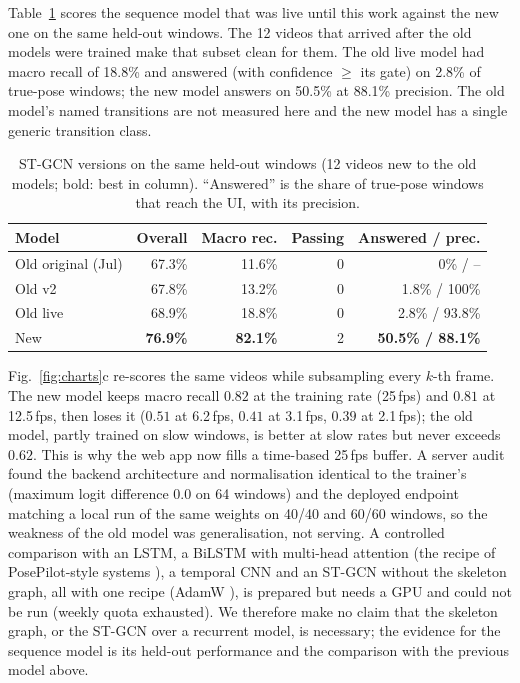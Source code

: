  Table~\ref{tab:stgcn} scores the sequence model that was live until this work against the new one on the same held-out windows. The 12 videos that arrived after the old models were trained make that subset clean for them. The old live model had macro recall of 18.8\% and answered (with confidence $\ge$ its gate) on 2.8\% of true-pose windows; the new model answers on 50.5\% at 88.1\% precision. The old model's named transitions are not measured here and the new model has a single generic transition class.
\begin{table}[t]
\centering\footnotesize
\caption{ST-GCN versions on the same held-out windows (12 videos new to the old models; bold: best in column). ``Answered'' is the share of true-pose windows that reach the UI, with its precision.}\label{tab:stgcn}
\begin{tabular}{@{}lrrrr@{}}
\toprule
Model & Overall & Macro rec. & Passing & Answered / prec. \\ \midrule
Old original (Jul) & 67.3\% & 11.6\% & 0 & 0\% / -- \\
Old v2 & 67.8\% & 13.2\% & 0 & 1.8\% / 100\% \\
Old live & 68.9\% & 18.8\% & 0 & 2.8\% / 93.8\% \\
New & \textbf{76.9\%} & \textbf{82.1\%} & 2 & \textbf{50.5\% / 88.1\%} \\ \bottomrule
\end{tabular}
\end{table}

 Fig.~\ref{fig:charts}c re-scores the same videos while subsampling every $k$-th frame. The new model keeps macro recall $0.82$ at the training rate (25\,fps) and $0.81$ at 12.5\,fps, then loses it ($0.51$ at 6.2\,fps, $0.41$ at 3.1\,fps, $0.39$ at 2.1\,fps); the old model, partly trained on slow windows, is better at slow rates but never exceeds $0.62$. This is why the web app now fills a time-based 25\,fps buffer. A server audit found the backend architecture and normalisation identical to the trainer's (maximum logit difference 0.0 on 64 windows) and the deployed endpoint matching a local run of the same weights on 40/40 and 60/60 windows, so the weakness of the old model was generalisation, not serving.
 A controlled comparison with an LSTM, a BiLSTM with multi-head attention (the recipe of PosePilot-style systems \cite{gadhvi2025posepilot}), a temporal CNN and an ST-GCN without the skeleton graph, all with one recipe (AdamW \cite{loshchilov2019adamw}), is prepared but needs a GPU and could not be run (weekly quota exhausted). We therefore make no claim that the skeleton graph, or the ST-GCN over a recurrent model, is necessary; the evidence for the sequence model is its held-out performance and the comparison with the previous model above.

